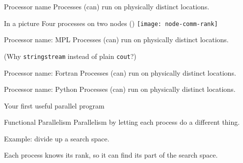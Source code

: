 \begin{numberedframe}{Processor name}
  Processes (can) run on physically distinct locations.

\end{numberedframe}

\begin{numberedframe}{In a picture}
  Four processes on two nodes ()
  \texttt{[image: node-comm-rank]}
\end{numberedframe}

\begin{mpl}
  \addtocounter{slidecount}{-1}
\begin{numberedframe}[l]{Processor name: MPL}
  Processes (can) run on physically distinct locations.


  (Why \lstinline{stringstream} instead of plain \lstinline{cout}?)
\end{numberedframe}
\end{mpl}

\begin{fortran}
  \addtocounter{slidecount}{-1}
\begin{numberedframe}[f]{Processor name: Fortran}
  Processes (can) run on physically distinct locations.

\end{numberedframe}
\end{fortran}

\begin{python}
  \addtocounter{slidecount}{-1}
\begin{numberedframe}[p]{Processor name: Python}
  Processes (can) run on physically distinct locations.

\end{numberedframe}
\end{python}



 {Your first useful parallel program}

\begin{numberedframe}{Functional Parallelism}
  Parallelism by letting each process do a different thing.

  Example: divide up a search space.

  Each process knows its rank, so it can find its part of the search space.
\end{numberedframe}

\begin{exerciseframe}[prime]
  
\end{exerciseframe}

\begin{exerciseframe}
  
\end{exerciseframe}

\endinput

\begin{numberedframe}\frametitle{}
\begin{lstlisting}
  
\end{lstlisting}
\end{numberedframe}

